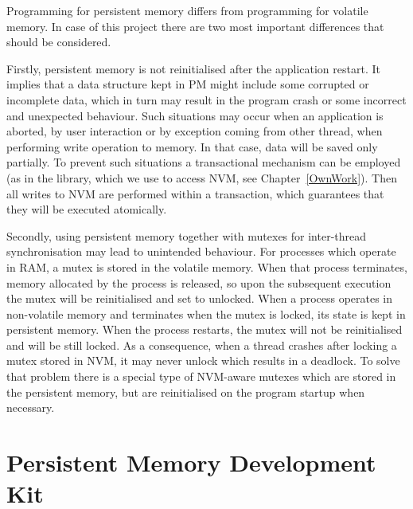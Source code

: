     
        Programming for persistent memory differs from programming for volatile memory. 
        In case of this project there are two most important differences that should be considered.
        
        Firstly, persistent memory is not reinitialised after the application restart. It implies that a data structure kept in PM might include some corrupted or incomplete data, which in turn may result in the program crash or some incorrect and unexpected behaviour. Such situations may occur when an application is aborted, by user interaction or by exception coming from other thread, when performing write operation to memory. In that case, data will be saved only partially. To prevent such situations a transactional mechanism can be employed (as in the \libpmemobj library, which we use to access NVM, see Chapter~\ref{OwnWork}). Then all writes to NVM are performed within a transaction, which guarantees that they will be executed atomically.
        
        Secondly, using persistent memory together with mutexes for inter-thread synchronisation may lead to unintended behaviour. 
        For processes which operate in RAM, a mutex is stored in the volatile memory. When that process terminates, memory allocated by the process is released, so upon the subsequent execution the mutex will be reinitialised and set to unlocked. When a process operates in non-volatile memory and terminates when the mutex is locked, its state is kept in persistent memory. When the process
        restarts, the mutex will not be reinitialised and will be still locked. As a consequence, when a thread crashes after locking a mutex stored in NVM, it may never unlock which results in a deadlock. To solve that problem there is a special type of NVM-aware mutexes which are stored in the persistent memory, but are reinitialised on the program startup when necessary. 
      
\section{Persistent Memory Development Kit}

